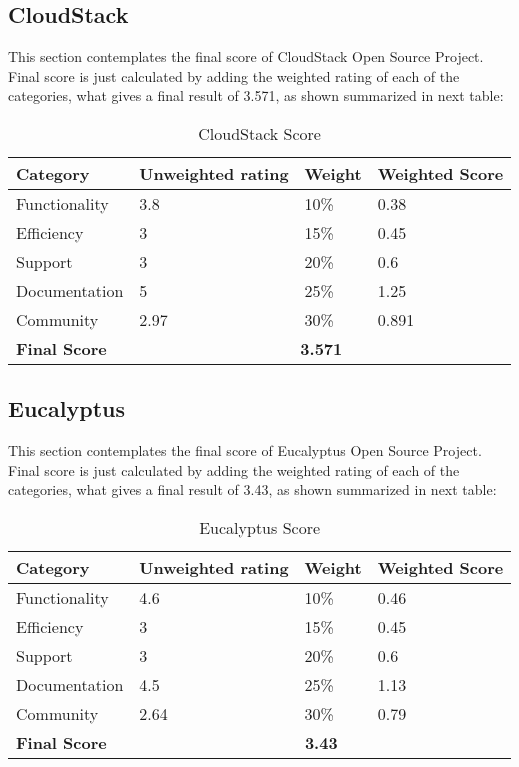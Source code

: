 \documentclass[11pt]{article}
\begin{document}
\subsection{CloudStack}
This section contemplates the final score of CloudStack Open Source Project. Final score is just calculated by adding the weighted rating of each of the categories, what gives a final result of 3.571, as shown summarized in next table:
\begin{table}[H]
  \begin{center}
    \begin{tabular}{ | p{3cm} | p{2.5cm} | p{1.5cm} | p{2cm} | }
    \toprule
    \textbf{Category} & \textbf{Unweighted rating} & \textbf{Weight} & \textbf{Weighted Score}\\
    \hline
    Functionality & 3.8 & 10\% & 0.38\\
    \hline
    Efficiency & 3 & 15\% & 0.45\\
    \hline
    Support & 3 & 20\% & 0.6\\
    \hline
    Documentation & 5 & 25\% & 1.25\\
    \hline
    Community & 2.97 & 30\% & 0.891\\
    \midrule
    \textbf{Final Score} & \multicolumn {3}{c|}{\textbf{3.571}}\\
    \bottomrule
    \end{tabular}
    \caption{CloudStack Score}
    \label{tab:cloudstack_score}
  \end{center}
\end{table}

\subsection{Eucalyptus}
This section contemplates the final score of Eucalyptus Open Source Project. Final score is just calculated by adding the weighted rating of each of the categories, what gives a final result of 3.43, as shown summarized in next table:
\begin{table}[H]
  \begin{center}
    \begin{tabular}{ | p{3cm} | p{2.5cm} | p{1.5cm} | p{2cm} | }
    \toprule
    \textbf{Category} & \textbf{Unweighted rating} & \textbf{Weight} & \textbf{Weighted Score}\\
    \hline
    Functionality & 4.6 & 10\% & 0.46\\
    \hline
    Efficiency & 3 & 15\% & 0.45\\
    \hline
    Support & 3 & 20\% & 0.6\\
    \hline
    Documentation & 4.5 & 25\% & 1.13\\
    \hline
    Community & 2.64 & 30\% & 0.79\\
    \midrule
    \textbf{Final Score} & \multicolumn {3}{c|}{\textbf{3.43}}\\
    \bottomrule
    \end{tabular}
    \caption{Eucalyptus Score}
    \label{tab:eucalyptus_score}
  \end{center}
\end{table}
\end{document}

